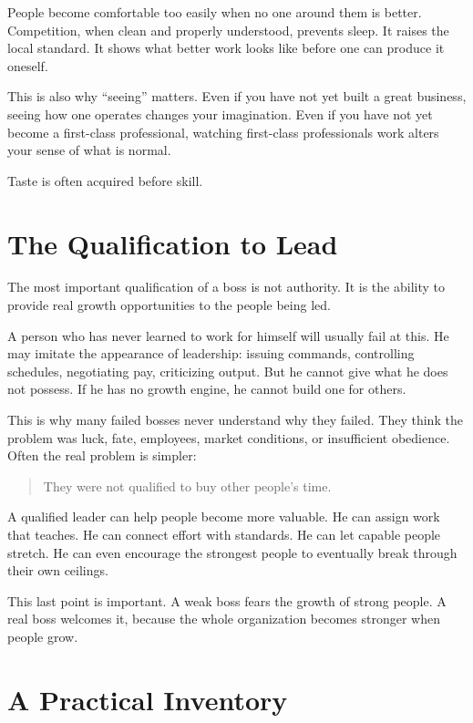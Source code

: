 People become comfortable too easily when no one around them is better. Competition, when clean and properly understood, prevents sleep. It raises the local standard. It shows what better work looks like before one can produce it oneself.

This is also why ``seeing'' matters. Even if you have not yet built a great business, seeing how one operates changes your imagination. Even if you have not yet become a first-class professional, watching first-class professionals work alters your sense of what is normal.

Taste is often acquired before skill.

\section*{The Qualification to Lead}

The most important qualification of a boss is not authority. It is the ability to provide real growth opportunities to the people being led.

A person who has never learned to work for himself will usually fail at this. He may imitate the appearance of leadership: issuing commands, controlling schedules, negotiating pay, criticizing output. But he cannot give what he does not possess. If he has no growth engine, he cannot build one for others.

This is why many failed bosses never understand why they failed. They think the problem was luck, fate, employees, market conditions, or insufficient obedience. Often the real problem is simpler:

\begin{quote}
They were not qualified to buy other people's time.
\end{quote}

A qualified leader can help people become more valuable. He can assign work that teaches. He can connect effort with standards. He can let capable people stretch. He can even encourage the strongest people to eventually break through their own ceilings.

This last point is important. A weak boss fears the growth of strong people. A real boss welcomes it, because the whole organization becomes stronger when people grow.

\section*{A Practical Inventory}

